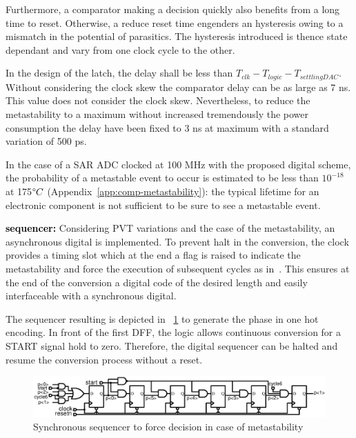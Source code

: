 Furthermore, a comparator making a decision quickly also benefits from a long time to reset. Otherwise, a reduce reset time engenders an hysteresis owing to a mismatch in the potential of parasitics. The hysteresis introduced is thence state dependant and vary from one clock cycle to the other. 

In the design of the latch, the delay shall be less than \(T_{clk} -  T_{logic} - T_{settlingDAC}\). Without considering the clock skew the comparator delay can be as large as 7 ns. This value does not consider the clock skew. Nevertheless, to reduce the metastability to a maximum without increased tremendously the power consumption the delay have been fixed to 3 ns at maximum with a standard variation of 500 ps.

In the case of a SAR ADC clocked at 100 MHz with the proposed digital scheme, the probability of a metastable event to occur is estimated to be less than $10^{-18}$ at 175$\degree C$ (Appendix~\ref{app:comp-metastability}): the typical lifetime for an electronic component is not sufficient to be sure to see a metastable event.

\textbf{\textcolor{black}{sequencer:}}
Considering PVT variations and the case of the metastability, an asynchronous digital is implemented. To prevent halt in the conversion, the clock provides a timing slot which at the end a flag is raised to indicate the metastability and force the execution of subsequent cycles as in~\cite{Tung2016}. This ensures at the end of the conversion a digital code of the desired length and easily interfaceable with a synchronous digital.

The sequencer resulting is depicted in \figurename~\ref{fig:sar-async-sequencer} to generate the phase in one hot encoding. In front of the first DFF, the logic allows continuous conversion for a START signal hold to zero. Therefore, the digital sequencer can be halted and resume the conversion process without a reset.

\begin{figure}[htp]
	\centering
	\includegraphics[width=\textwidth]{Chapter4/Figs/sar-sequencer.ps}
	\caption{Synchronous sequencer to force decision in case of metastability}
	\label{fig:sar-async-sequencer}
\end{figure}

